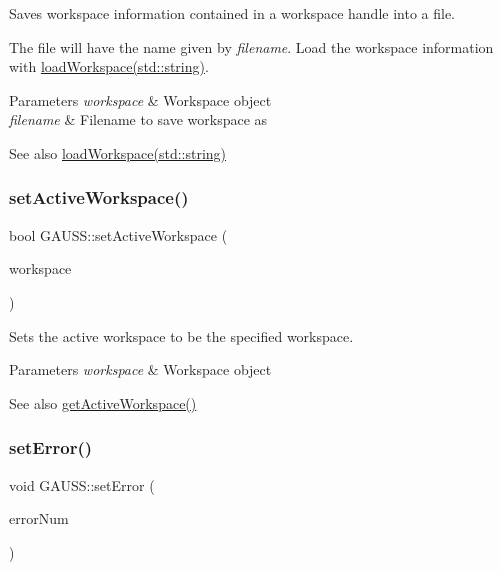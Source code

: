 Saves workspace information contained in a workspace handle into a file. 

The file will have the name given by {\itshape filename}. Load the workspace information with \hyperlink{class_g_a_u_s_s_a7735659dac094c3af6c438011afb2a77}{load\+Workspace(std\+::string)}.


\begin{DoxyParams}{Parameters}
{\em workspace} & Workspace object \\
\hline
{\em filename} & Filename to save workspace as\\
\hline
\end{DoxyParams}
\begin{DoxySeeAlso}{See also}
\hyperlink{class_g_a_u_s_s_a7735659dac094c3af6c438011afb2a77}{load\+Workspace(std\+::string)} 
\end{DoxySeeAlso}
\mbox{\label{class_g_a_u_s_s_a6b94adbb7ad799f1e025cd4d7f08f75b}} 
\subsubsection{\texorpdfstring{set\+Active\+Workspace()}{setActiveWorkspace()}}
{\footnotesize\ttfamily bool G\+A\+U\+S\+S\+::set\+Active\+Workspace (\begin{DoxyParamCaption}\item[{\hyperlink{class_g_e_workspace}{G\+E\+Workspace} $\ast$}]{workspace }\end{DoxyParamCaption})}



Sets the active workspace to be the specified workspace. 


\begin{DoxyParams}{Parameters}
{\em workspace} & Workspace object\\
\hline
\end{DoxyParams}
\begin{DoxySeeAlso}{See also}
\hyperlink{class_g_a_u_s_s_a34f3cc44cd296cc326ced670d2ac6a59}{get\+Active\+Workspace()} 
\end{DoxySeeAlso}
\mbox{\label{class_g_a_u_s_s_a4adc9a33b8be97b1a6592160fea4a4eb}} 
\subsubsection{\texorpdfstring{set\+Error()}{setError()}}
{\footnotesize\ttfamily void G\+A\+U\+S\+S\+::set\+Error (\begin{DoxyParamCaption}\item[{int}]{error\+Num }\end{DoxyParamCaption})}



